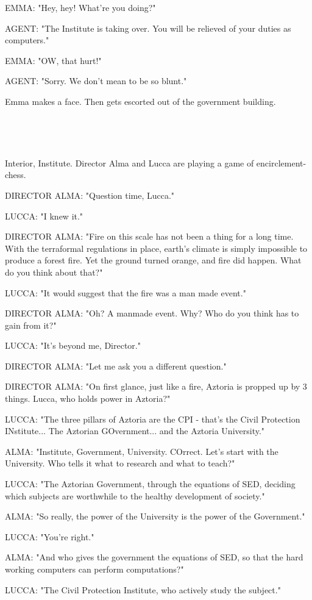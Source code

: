 \documentclass[11pt]{article}
\begin{document}
EMMA: "Hey, hey! What're you doing?"

AGENT: "The Institute is taking over. 
You will be relieved of your duties as computers."

EMMA: "OW, that hurt!"

AGENT: "Sorry. We don't mean to be so blunt."

Emma makes a face. Then gets escorted out of the government building.

\ 

\ 

Interior, Institute.
Director Alma and Lucca are playing a game of encirclement-chess.

DIRECTOR ALMA: "Question time, Lucca."

LUCCA: "I knew it."

DIRECTOR ALMA: "Fire on this scale has not been a thing for a long time.
With the terraformal regulations in place, earth's climate is simply impossible to produce a forest fire.
Yet the ground turned orange, and fire did happen.
What do you think about that?"

LUCCA: "It would suggest that the fire was a man made event."

DIRECTOR ALMA: "Oh? A manmade event.
Why? Who do you think has to gain from it?"

LUCCA: "It's beyond me, Director."

DIRECTOR ALMA: "Let me ask you a different question."

DIRECTOR ALMA: "On first glance, just like a fire, Aztoria is propped up by 3 things.
Lucca, who holds power in Aztoria?"

LUCCA: "The three pillars of Aztoria are the CPI - that's the Civil Protection INstitute... The Aztorian GOvernment... and the Aztoria University."

ALMA: "Institute, Government, University. COrrect.
Let's start with the University.
Who tells it what to research and what to teach?"

LUCCA: "The Aztorian Government, through the equations of SED, deciding which subjects are worthwhile to the healthy development of society."

ALMA: "So really, the power of the University is the power of the Government."

LUCCA: "You're right."

ALMA: "And who gives the government the equations of SED, so that the hard working computers can perform computations?"

LUCCA: "The Civil Protection Institute, who actively study the subject."
\end{document}
